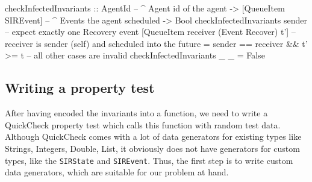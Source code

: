 \begin{HaskellCode}
checkInfectedInvariants :: AgentId              -- ^ Agent id of the agent 
                        -> [QueueItem SIREvent] -- ^ Events the agent scheduled
                        -> Bool
checkInfectedInvariants sender 
  -- expect exactly one Recovery event
  [QueueItem receiver (Event Recover) t'] 
  -- receiver is sender (self) and scheduled into the future
  = sender == receiver && t' >= t 
-- all other cases are invalid
checkInfectedInvariants _ _ = False
\end{HaskellCode}

%
%

\subsection{Writing a property test}
After having encoded the invariants into a function, we need to write a QuickCheck property test which calls this function with random test data. Although QuickCheck comes with a lot of data generators for existing types like Strings, Integers, Double, List, it obviously does not have generators for custom types, like the \texttt{SIRState} and \texttt{SIREvent}. Thus, the first step is to write custom data generators, which are suitable for our problem at hand.

